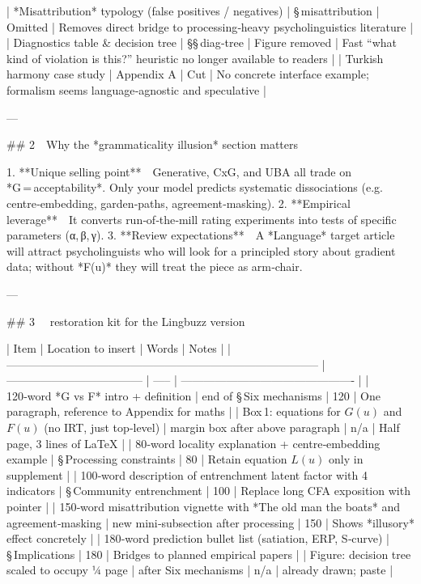 | *Misattribution* typology (false positives / negatives) | § misattribution                               | Omitted                                      | Removes direct bridge to processing‑heavy psycholinguistics literature                               |
| Diagnostics table & decision tree                       | §§ diag‑tree                                   | Figure removed                               | Fast “what kind of violation is this?” heuristic no longer available to readers                      |
| Turkish harmony case study                              | Appendix A                                     | Cut                                          | No concrete interface example; formalism seems language‑agnostic and speculative                     |

---

## 2 Why the *grammaticality illusion* section matters

1. **Unique selling point** Generative, CxG, and UBA all trade on *G = acceptability*.  Only your model predicts systematic dissociations (e.g. centre‑embedding, garden‑paths, agreement‑masking).
2. **Empirical leverage** It converts run‑of‑the‑mill rating experiments into tests of specific parameters (α, β, γ).
3. **Review expectations** A *Language* target article will attract psycholinguists who will look for a principled story about gradient data; without *F(u)* they will treat the piece as arm‑chair.

---

## 3  restoration kit for the Lingbuzz version


| Item                                                                                | Location to insert                   | Words | Notes                                          |
| ----------------------------------------------------------------------------------- | ------------------------------------ | ----- | ---------------------------------------------- |
| 120‑word *G vs F* intro + definition                                                | end of § Six mechanisms              | 120   | One paragraph, reference to Appendix for maths |
| Box 1: equations for $G(u)$ and $F(u)$ (no IRT, just top‑level)                     | margin box after above paragraph     | n/a   | Half page, 3 lines of LaTeX                    |
| 80‑word locality explanation + centre‑embedding example                             | § Processing constraints             | 80    | Retain equation $L(u)$ only in supplement      |
| 100‑word description of entrenchment latent factor with 4 indicators                | § Community entrenchment             | 100   | Replace long CFA exposition with pointer       |
| 150‑word misattribution vignette with *The old man the boats* and agreement‑masking | new mini‑subsection after processing | 150   | Shows *illusory* effect concretely             |
| 180‑word prediction bullet list (satiation, ERP, S‑curve)                           | § Implications                       | 180   | Bridges to planned empirical papers            |
| Figure: decision tree scaled to occupy ¼ page                                       | after Six mechanisms                 | n/a   | already drawn; paste                           |

